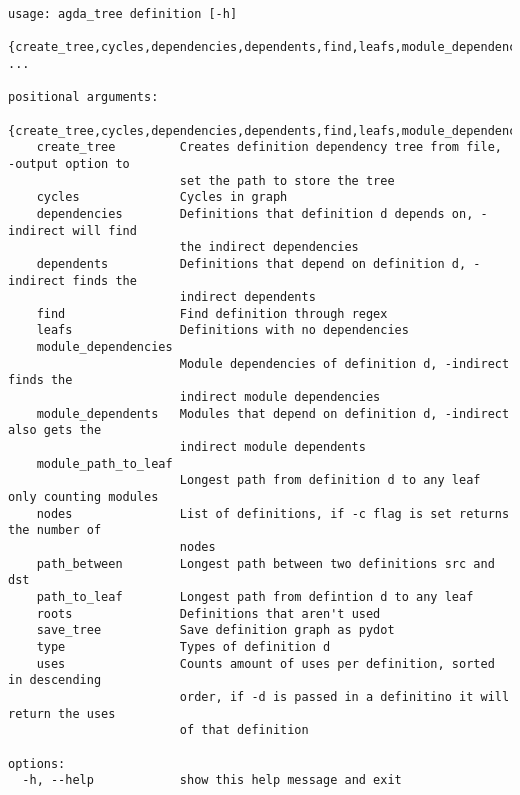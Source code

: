\begin{lstlisting}
usage: agda_tree definition [-h]
                            {create_tree,cycles,dependencies,dependents,find,leafs,module_dependencies,module_dependents,module_path_to_leaf,nodes,path_between,path_to_leaf,roots,save_tree,type,uses} ...

positional arguments:
  {create_tree,cycles,dependencies,dependents,find,leafs,module_dependencies,module_dependents,module_path_to_leaf,nodes,path_between,path_to_leaf,roots,save_tree,type,uses}
    create_tree         Creates definition dependency tree from file, -output option to
                        set the path to store the tree
    cycles              Cycles in graph
    dependencies        Definitions that definition d depends on, -indirect will find
                        the indirect dependencies
    dependents          Definitions that depend on definition d, -indirect finds the
                        indirect dependents
    find                Find definition through regex
    leafs               Definitions with no dependencies
    module_dependencies
                        Module dependencies of definition d, -indirect finds the
                        indirect module dependencies
    module_dependents   Modules that depend on definition d, -indirect also gets the
                        indirect module dependents
    module_path_to_leaf
                        Longest path from definition d to any leaf only counting modules
    nodes               List of definitions, if -c flag is set returns the number of
                        nodes
    path_between        Longest path between two definitions src and dst
    path_to_leaf        Longest path from defintion d to any leaf
    roots               Definitions that aren't used
    save_tree           Save definition graph as pydot
    type                Types of definition d
    uses                Counts amount of uses per definition, sorted in descending
                        order, if -d is passed in a definitino it will return the uses
                        of that definition

options:
  -h, --help            show this help message and exit
\end{lstlisting}

